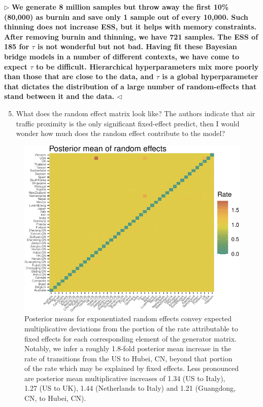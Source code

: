 \documentclass[12pt]{article}
\newenvironment{reply}{$\triangleright$\bfseries}{$\triangleleft$}
\begin{document}
\begin{reply}
We generate 8 million samples but throw away the first 10\% (80,000) as burnin and save only 1 sample out of every 10,000.  Such thinning does not increase ESS, but it helps with memory constraints.  After removing burnin and thinning, we have 721 samples.   The ESS of 185 for $\tau$ is not wonderful but not bad.  Having fit these Bayesian bridge models in a number of different contexts, we have come to expect $\tau$ to be difficult.   Hierarchical hyperparameters mix more poorly than those that are close to the data, and $\tau$ is a global hyperparameter that dictates the distribution of a large number of random-effects that stand between it and the data.
\end{reply}

\begin{enumerate}	
\setcounter{enumi}{4}	
	\item What does the random effect matrix look like? The authors indicate that air traffic proximity is the only significant fixed-effect predict, then I would wonder how much does the random effect contribute to the model?
\end{enumerate}

\begin{figure}[t]
	\centering
	\includegraphics[width=0.7\linewidth]{figures/randEffects.pdf}
	\caption{Posterior means for exponentiated random effects convey expected multiplicative deviations from the portion of the rate attributable to fixed effects for each corresponding element of the generator matrix.  Notably, we infer a roughly 1.8-fold posterior mean increase in the rate of transitions from the US to Hubei, CN, beyond that portion of the rate which may be explained by fixed effects.  Less pronounced are posterior mean multiplicative increases of 1.34 (US to Italy), 1.27 (US to UK), 1.44 (Netherlands to Italy) and 1.21 (Guangdong, CN, to Hubei, CN).}
\end{figure}
\end{document}
